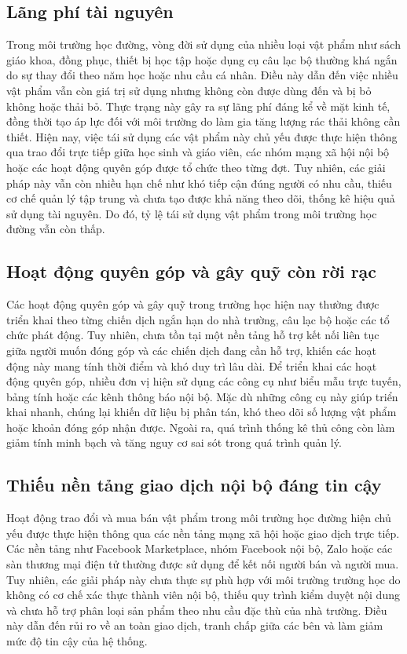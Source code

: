 \documentclass[12pt,a4paper]{report}
\begin{document}
\subsection{Lãng phí tài nguyên}

Trong môi trường học đường, vòng đời sử dụng của nhiều loại vật phẩm như
sách giáo khoa, đồng phục, thiết bị học tập hoặc dụng cụ câu lạc bộ thường khá
ngắn do sự thay đổi theo năm học hoặc nhu cầu cá nhân. Điều này dẫn đến việc nhiều vật phẩm vẫn còn giá trị sử dụng nhưng không còn được dùng đến và bị bỏ
không hoặc thải bỏ. Thực trạng này gây ra sự lãng phí đáng kể về mặt kinh tế,
đồng thời tạo áp lực đối với môi trường do làm gia tăng lượng rác thải không cần
thiết. Hiện nay, việc tái sử dụng các vật phẩm này chủ yếu được thực hiện thông
qua trao đổi trực tiếp giữa học sinh và giáo viên, các nhóm mạng xã hội nội bộ
hoặc các hoạt động quyên góp được tổ chức theo từng đợt. Tuy nhiên, các giải
pháp này vẫn còn nhiều hạn chế như khó tiếp cận đúng người có nhu cầu, thiếu cơ
chế quản lý tập trung và chưa tạo được khả năng theo dõi, thống kê hiệu quả sử
dụng tài nguyên. Do đó, tỷ lệ tái sử dụng vật phẩm trong môi trường học đường
vẫn còn thấp.

\subsection{Hoạt động quyên góp và gây quỹ còn rời rạc}

Các hoạt động quyên góp và gây quỹ trong trường học hiện nay thường được
triển khai theo từng chiến dịch ngắn hạn do nhà trường, câu lạc bộ hoặc các tổ
chức phát động. Tuy nhiên, chưa tồn tại một nền tảng hỗ trợ kết nối liên tục giữa
người muốn đóng góp và các chiến dịch đang cần hỗ trợ, khiến các hoạt động này
mang tính thời điểm và khó duy trì lâu dài. Để triển khai các hoạt động quyên
góp, nhiều đơn vị hiện sử dụng các công cụ như biểu mẫu trực tuyến, bảng tính
hoặc các kênh thông báo nội bộ. Mặc dù những công cụ này giúp triển khai nhanh,
chúng lại khiến dữ liệu bị phân tán, khó theo dõi số lượng vật phẩm hoặc khoản
đóng góp nhận được. Ngoài ra, quá trình thống kê thủ công còn làm giảm tính
minh bạch và tăng nguy cơ sai sót trong quá trình quản lý.

\subsection{Thiếu nền tảng giao dịch nội bộ đáng tin cậy}

Hoạt động trao đổi và mua bán vật phẩm trong môi trường học đường hiện
chủ yếu được thực hiện thông qua các nền tảng mạng xã hội hoặc giao dịch trực
tiếp. Các nền tảng như Facebook Marketplace, nhóm Facebook nội bộ, Zalo hoặc
các sàn thương mại điện tử thường được sử dụng để kết nối người bán và người
mua. Tuy nhiên, các giải pháp này chưa thực sự phù hợp với môi trường trường
học do không có cơ chế xác thực thành viên nội bộ, thiếu quy trình kiểm duyệt
nội dung và chưa hỗ trợ phân loại sản phẩm theo nhu cầu đặc thù của nhà trường.
Điều này dẫn đến rủi ro về an toàn giao dịch, tranh chấp giữa các bên và làm giảm
mức độ tin cậy của hệ thống.
\end{document}
